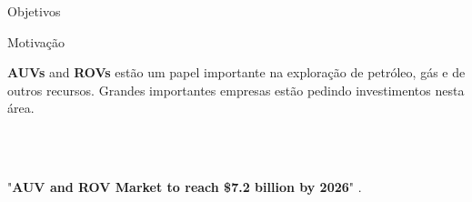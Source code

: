\begin{frame}[c]{Objetivos} 
    
    \transdissolve[duration=0.5]
   
    \begin{center}
    \end{center}

\end{frame}


\begin{frame}[t]{Motivação} 
  
  \textbf{AUVs} and \textbf{ROVs} estão um papel importante na exploração de petróleo, gás e de outros recursos. Grandes importantes empresas estão pedindo investimentos nesta área.

  \newline
  \newline
  \newline
  \newline
  \newline
  \\
  \vspace{1.75cm}
  \\
  \begin{center}
  "\textbf{AUV and ROV Market to reach \$7.2 billion by 2026}" \cite{reportlinker}.

\end{center}


\end{frame}




    
   
